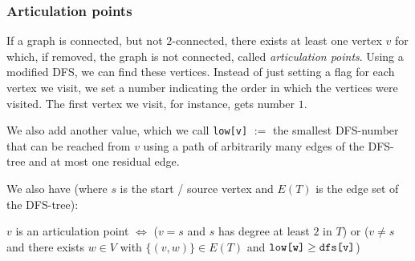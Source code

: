 \newpage
\subsubsection{Articulation points}
If a graph is connected, but not $2$-connected, there exists at least one vertex $v$ for which, if removed, the graph is not connected, called \textit{articulation points}. Using a modified DFS, we can find these vertices. Instead of just setting a flag for each vertex we visit, we set a number indicating the order in which the vertices were visited. The first vertex we visit, for instance, gets number $1$.

We also add another value, which we call \verb|low[v]| $:=$ the smallest DFS-number that can be reached from $v$ using a path of arbitrarily many edges of the DFS-tree and at most one residual edge.

We also have (where $s$ is the start / source vertex and $E(T)$ is the edge set of the DFS-tree):

$v$ is an articulation point $\Leftrightarrow$ ($v = s$ and $s$ has degree at least $2$ in $T$) or ($v \neq s$ and there exists $w \in V$ with $\{(v, w)\} \in E(T)$ and $\verb|low[w]| \geq \verb|dfs[v]|$)


